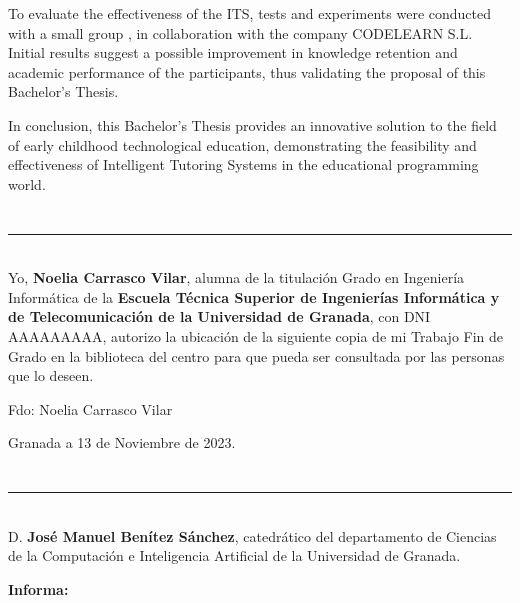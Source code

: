 To evaluate the effectiveness of the ITS, tests and experiments were conducted with a small group , in collaboration with the company CODELEARN S.L. Initial results suggest a possible improvement in knowledge retention and academic performance of the participants, thus validating the proposal of this Bachelor's Thesis.

In conclusion, this Bachelor's Thesis provides an innovative solution to the field of early childhood technological education, demonstrating the feasibility and effectiveness of Intelligent Tutoring Systems in the educational programming world.

\chapter*{}
\thispagestyle{empty}

\noindent\rule[-1ex]{\textwidth}{2pt}\\[4.5ex]

Yo, \textbf{Noelia Carrasco Vilar}, alumna de la titulación Grado en Ingeniería Informática de la \textbf{Escuela Técnica Superior
de Ingenierías Informática y de Telecomunicación de la Universidad de
Granada}, con DNI AAAAAAAAA, autorizo la
ubicación de la siguiente copia de mi Trabajo Fin de Grado en la biblioteca
del centro para que pueda ser
consultada por las personas que lo deseen.

\vspace{6cm}

\noindent Fdo: Noelia Carrasco Vilar

\vspace{2cm}

\begin{flushright}
Granada a 13 de Noviembre de 2023.
\end{flushright}


\chapter*{}
\thispagestyle{empty}

\noindent\rule[-1ex]{\textwidth}{2pt}\\[4.5ex]

D. \textbf{José Manuel Benítez Sánchez}, catedrático del departamento de Ciencias de la Computación e Inteligencia Artificial de la Universidad de Granada.


\vspace{0.5cm}

\textbf{Informa:}

